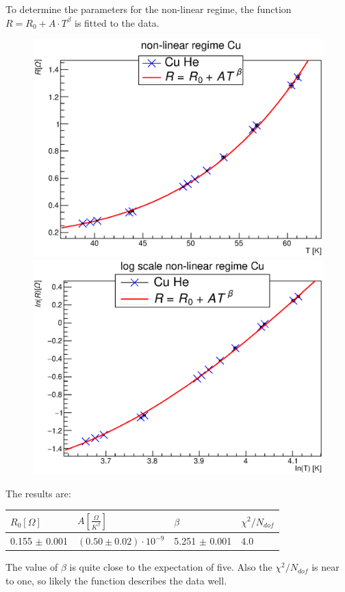 \documentclass{article}
\begin{document}
To determine the parameters for the non-linear regime, the function $R = R_0 + A \cdot T^\beta$ is fitted to the data.  
\begin{figure}[H]
    \begin{minipage}{0.49\textwidth}
        \includegraphics[width=\textwidth]{Graphen/Cu.eps}
    \end{minipage}
    \begin{minipage}{0.49\textwidth}
        \includegraphics[width=\textwidth]{Graphen/ln_Cu.eps}
    \end{minipage}
\end{figure}
The results are:
\begin{table}[H]
    \centering
        \begin{tabular}{l|l|l|l}
        $R_0 [\Omega]$ & $ A[\si{\frac{\Omega}{K^\beta}}]$ & $\beta$ & $\chi^2/N_{dof}$\\\hline
        0.155 $\pm$ 0.001 & $(0.50 \pm 0.02)\cdot 10^{-9}$ & 5.251 $\pm$ 0.001 & 4.0 \\
        \end{tabular}
\end{table}
The value of $\beta$ is quite close to the expectation of five. Also the $\chi^2/N_{dof}$ is near to one, so likely the function describes the data well.
\end{document}
